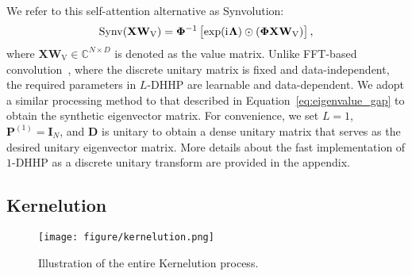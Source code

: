 We refer to this self-attention alternative as Synvolution:
\begin{equation}\label{eq:synvolution}
\centering
\mathrm{Synv}(\mathbf{X}\mathbf{W}_{\text{V}})
= \bm{\Phi}^{-1}\left[\exp(\ramuno\mathbf{\Lambda})\odot(\bm{\Phi}\mathbf{X}\mathbf{W}_{\text{V}})\right],
\end{equation}
where $\mathbf{X}\mathbf{W}_{\text{V}} \in \mathbb{C}^{N \times D}$ is denoted as the value matrix. Unlike FFT-based convolution~\citep{mathieu2013fast}, where the discrete unitary matrix is fixed and data-independent, the required parameters in $L$-DHHP are learnable and data-dependent. We adopt a similar processing method to that described in Equation~\ref{eq:eigenvalue_gap} to obtain the synthetic eigenvector matrix. For convenience, we set $L=1$, $\mathbf{P}^{(1)} = \mathbf{I}_{N}$, and $\mathbf{D}$ is unitary to obtain a dense unitary matrix that serves as the desired unitary eigenvector matrix. More details about the fast implementation of $1$-DHHP as a discrete unitary transform are provided in the appendix.


\subsection{Kernelution}

\begin{figure*}[t]
\begin{center}
\texttt{[image: figure/kernelution.png]}
\end{center}
\caption{Illustration of the entire Kernelution process.}
\label{fig:kernelution}
\end{figure*}

